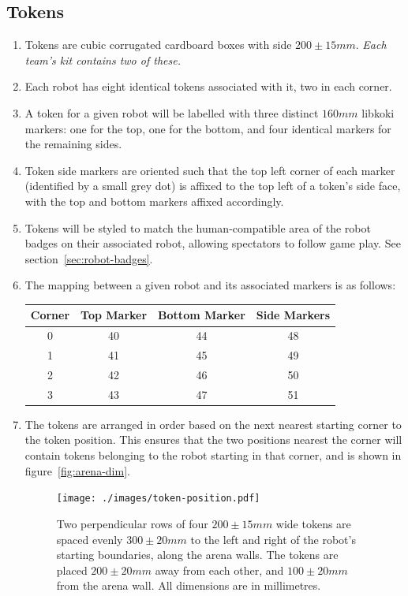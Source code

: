 \subsection{Tokens}
\label{sub:Tokens}
\begin{enumerate}
\item Tokens are cubic corrugated cardboard boxes with side $200 \pm 15 mm$.
      \emph{Each team's kit contains two of these.}

\item Each robot has eight identical tokens associated with it, two in each corner.

\item A token for a given robot will be labelled with three distinct $160mm$ libkoki markers: one for the top, one for the bottom, and four identical markers for the remaining sides.

\item Token side markers are oriented such that the top left corner of each marker (identified by a small grey dot) is affixed to the top left of a token's side face, with the top and bottom markers affixed accordingly.

\item Tokens will be styled to match the human-compatible area of the robot badges on their associated robot, allowing spectators to follow game play.
      See section~\ref{sec:robot-badges}.

\item The mapping between a given robot and its associated markers is as follows:

\begin{center}
  \begin{tabular}{cccc}
    \toprule
    \textbf{Corner} & \textbf{Top Marker} & \textbf{Bottom Marker} & \textbf{Side Markers} \\
    \midrule
    0 & 40 & 44 & 48 \\
    1 & 41 & 45 & 49 \\
    2 & 42 & 46 & 50 \\
    3 & 43 & 47 & 51 \\
    \bottomrule
  \end{tabular}
\end{center}

\item The tokens are arranged in order based on the next nearest starting corner to the token position.
      This ensures that the two positions nearest the corner will contain tokens belonging to the robot starting in that corner,
      and is shown in figure~\ref{fig:arena-dim}.

\begin{figure}
  \centering
  \texttt{[image: ./images/token-position.pdf]}
  \caption{Two perpendicular rows of four $200 \pm 15mm$ wide tokens are spaced evenly $300 \pm 20mm$ to the left and right of the robot's starting boundaries, along the arena walls.
    The tokens are placed $200 \pm 20mm$ away from each other, and $100 \pm 20mm$ from the arena wall.
           All dimensions are in millimetres.}
  \label{fig:token-position}
\end{figure}

\end{enumerate}

\clearpage
